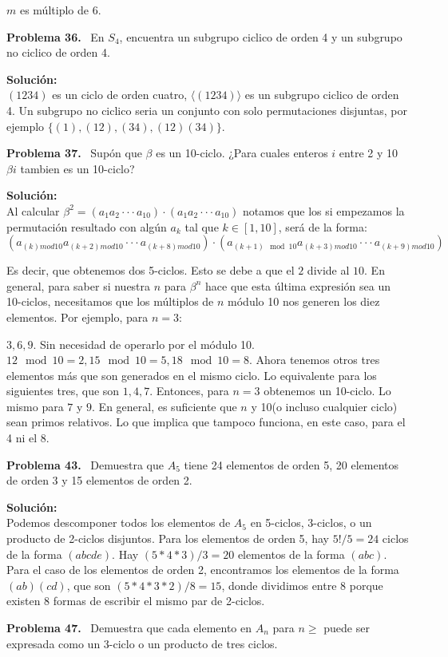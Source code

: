 \documentclass{article}
\newcounter{problem}
\newcounter{solution}
\newcommand\Problem[1]{%
  \stepcounter{problem}%
  \textbf{Problema #1.}~%
  \setcounter{solution}{0}%
}
\newcommand\TheSolution{%
  \textbf{Solución:}\\%
}
\begin{document}
$m$ es múltiplo de 6.

\Problem{36} En $S_4$, encuentra un subgrupo ciclico de orden 4 y un subgrupo
no ciclico de orden 4.

\TheSolution{} $(1234)$ es un ciclo de orden cuatro, $\langle(1234)\rangle$ es
un subgrupo ciclico de orden 4. Un subgrupo no ciclico seria un conjunto con
solo permutaciones disjuntas, por ejemplo $\{ (1), (12), (34), (12)(34)\}$.

\Problem{37} Supón que $\beta$ es un 10-ciclo. ¿Para cuales enteros $i$ entre
2 y 10 $\beta i$ tambien es un 10-ciclo?

\TheSolution{}
Al calcular $\beta ^{2} = (a_{1}a_{2}\cdot\cdot\cdot a_{10})\cdot (a_{1}a_{2}
\cdot\cdot\cdot a_{10})$  notamos que los si empezamos la permutación
resultado con algún $a_{k}$ tal que $k\in [1,10]$, será de la forma:
\[
  (a_{(k)mod10}a_{(k+2)mod10}\cdot\cdot\cdot a_{(k+8)mod10})\cdot (a_{(k+1)
  \mod10}a_{(k+3)mod10}\cdot\cdot\cdot a_{(k+9)mod10})
\]

Es decir, que obtenemos dos 5-ciclos. Esto se debe a que el $2$ divide al
$10$. En general, para saber si nuestra $n$ para $\beta ^{n}$ hace que esta
última expresión sea un 10-ciclos, necesitamos que los múltiplos de $n$ módulo
10 nos generen los diez elementos. Por ejemplo, para $n=3$:

$3,6,9$. Sin necesidad de operarlo por el módulo 10.
$12\mod10=2,15\mod10=5,18\mod10=8$. Ahora tenemos otros tres elementos más que
son generados en el mismo ciclo. Lo equivalente para los siguientes tres, que
son $1,4,7$. Entonces, para $n=3$ obtenemos un 10-ciclo. Lo mismo para $7$ y
$9$. En general, es suficiente que $n$ y 10(o incluso cualquier ciclo) sean
primos relativos. Lo que implica que tampoco funciona, en este caso, para el 4
ni el 8.

\Problem{43} Demuestra que $A_5$ tiene 24 elementos de orden 5, 20 elementos
de orden 3 y 15 elementos de orden 2.

\TheSolution{} Podemos descomponer todos los elementos de $A_5$ en 5-ciclos,
3-ciclos, o un producto de 2-ciclos disjuntos. Para los elementos de orden 5,
hay $5! / 5 = 24$ ciclos de la forma $(abcde)$. Hay $(5 * 4 * 3) / 3 = 20$
elementos de la forma $(abc)$. Para el caso de los elementos de orden 2,
encontramos los elementos de la forma $(ab)(cd)$, que son $(5 * 4 * 3 * 2)/8
= 15$, donde dividimos entre 8 porque existen 8 formas de escribir el mismo
par de 2-ciclos.

\Problem{47} Demuestra que cada elemento en $A_n$ para $n \geq$ puede ser
expresada como un 3-ciclo o un producto de tres ciclos.
\end{document}
